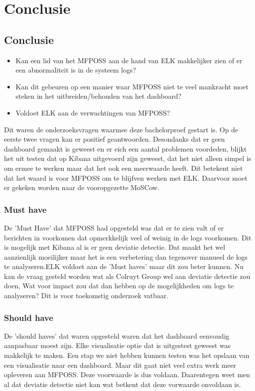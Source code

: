 
\chapter{Conclusie}%
\label{ch:conclusie}

\section{Conclusie}
\begin{itemize}
    \item Kan een lid van het MFPOSS aan de hand van ELK makkelijker zien of er een abnormaliteit is in de systeem logs?
    \item Kan dit gebeuren op een manier waar MFPOSS niet te veel mankracht moet steken in het uitbreiden/behouden van het dashboard?
    \item Voldoet ELK aan de verwachtingen van MFPOSS?
\end{itemize}

Dit waren de onderzoeksvragen waarmee deze bachelorproef gestart is. Op de eerste twee vragen kan er positief geantwoorden. Desondanks dat er geen dashboard gemaakt is geweest en er eich een aantal problemen voordeden, blijkt het uit testen dat op Kibana uitgevoerd zijn geweest, dat het niet alleen simpel is om ermee te werken maar dat het ook een meerwaarde heeft. Dit betekent niet dat het waard is voor MFPOSS om te blijfven werken met ELK. Daarvoor moet er gekeken worden naar de vooropgezette MoSCow.

\subsection{Must have}
De 'Must Have' dat MFPOSS had opgesteld was dat er te zien valt of er berichten in voorkomen dat opmerkkelijk veel of weinig in de logs voorkomen. Dit is mogelijk met Kibana al is er geen deviatie detectie. Dat maakt het wel aanzienlijk moeilijker maar het is een verbetering dan tegenover manueel de logs te analyseren.ELK voldoet aan de 'Must haves' maar dit zou beter kunnen. Nu kan de vraag gesteld worden wat als Colruyt Group wel aan deviatie detectie zou doen, Wat voor impact zou dat dan hebben op de mogelijkheden om logs te analyseren? Dit is voor toekomstig onderzoek vatbaar.

\subsection{Should have}
De 'should haves' dat waren opgesteld waren dat het dashboard eenvoudig aanpasbaar moest zijn. Elke visualisatie optie dat is uitgestest geweest was makkelijk te maken. Een stap we niet hebben kunnen testen was het opslaan van een visualisatie naar een dashboard. Maar dit gaat niet veel extra werk meer opleveren aan MFPOSS. Deze voorwaarde is dus voldaan. Daarentegen weet men al dat deviatie detectie niet kan wat betkent dat deze vorwaarde onvoldaan is.  

